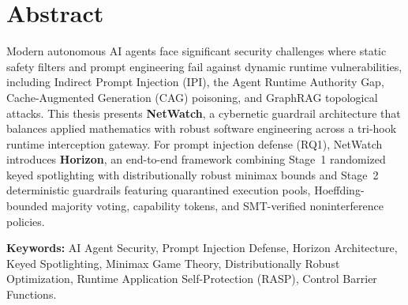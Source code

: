 \chapter*{Abstract}

\noindent
Modern autonomous AI agents face significant security challenges where static safety filters and prompt engineering fail against dynamic runtime vulnerabilities, including Indirect Prompt Injection (IPI), the Agent Runtime Authority Gap, Cache-Augmented Generation (CAG) poisoning, and GraphRAG topological attacks. This thesis presents \textbf{NetWatch}, a cybernetic guardrail architecture that balances applied mathematics with robust software engineering across a tri-hook runtime interception gateway. For prompt injection defense (RQ1), NetWatch introduces \textbf{Horizon}, an end-to-end framework combining Stage~1 randomized keyed spotlighting with distributionally robust minimax bounds and Stage~2 deterministic guardrails featuring quarantined execution pools, Hoeffding-bounded majority voting, capability tokens, and SMT-verified noninterference policies.

\vspace{1em}
\noindent\textbf{Keywords:} AI Agent Security, Prompt Injection Defense, Horizon Architecture, Keyed Spotlighting, Minimax Game Theory, Distributionally Robust Optimization, Runtime Application Self-Protection (RASP), Control Barrier Functions.
